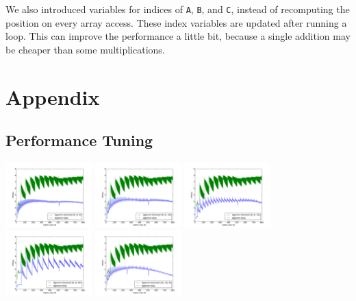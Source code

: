 \documentclass[12pt]{article}
\begin{document}
We also introduced variables for indices of \lstinline{A}, \lstinline{B}, and \lstinline{C}, instead of recomputing the position on every array access. These index variables are updated after running a loop. This can improve the performance a little bit, because a single addition may be cheaper than some multiplications.

\newpage
\section*{Appendix}
\subsection*{Performance Tuning}
	\includegraphics[width=0.25\textwidth]{graphs/profiles/PROFILE_OUTUT_8_8.pdf}  
	\includegraphics[width=0.25\textwidth]{graphs/profiles/PROFILE_OUTUT_8_16.pdf}  
	\includegraphics[width=0.25\textwidth]{graphs/profiles/PROFILE_OUTUT_8_32.pdf} 
	\includegraphics[width=0.25\textwidth]{graphs/profiles/PROFILE_OUTUT_8_64.pdf} 
	\includegraphics[width=0.25\textwidth]{graphs/profiles/PROFILE_OUTUT_16_8.pdf}  
\end{document}
